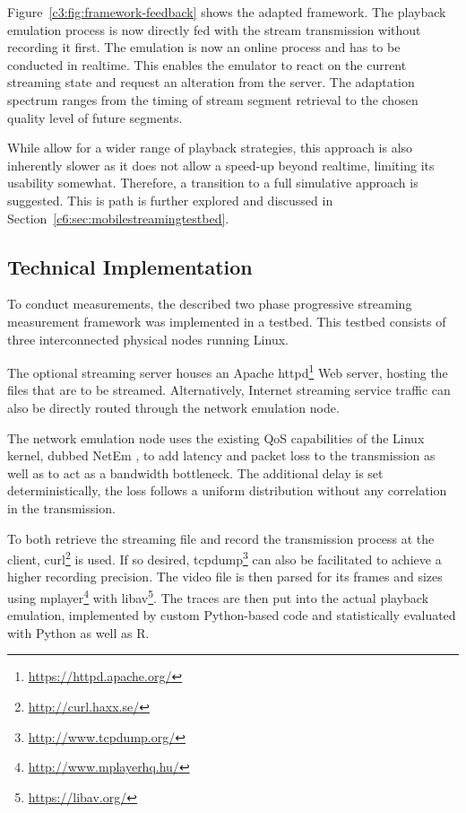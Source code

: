 Figure~\ref{c3:fig:framework-feedback} shows the adapted framework. The playback emulation process is now directly fed with the stream transmission without recording it first. The emulation is now an online process and has to be conducted in realtime. This enables the emulator to react on the current streaming state and request an alteration from the server. The adaptation spectrum ranges from the timing of stream segment retrieval to the chosen quality level of future segments. 

While allow for a wider range of playback strategies, this approach is also inherently slower as it does not allow a speed-up beyond realtime, limiting its usability somewhat. Therefore, a transition to a full simulative approach is suggested. This is path is further explored and discussed in Section~\ref{c6:sec:mobilestreamingtestbed}.



\subsection{Technical Implementation}

To conduct measurements, the described two phase progressive streaming measurement framework was implemented in a testbed. This testbed consists of three interconnected physical nodes running Linux. 

The optional streaming server houses an Apache httpd\footnote{\url{https://httpd.apache.org/}} Web server, hosting the files that are to be streamed. Alternatively, Internet streaming service traffic can also be directly routed through the network emulation node.

The network emulation node uses the existing \gls{QoS} capabilities of the Linux kernel, dubbed NetEm \cite{hemminger2005network}, to add latency and packet loss to the transmission as well as to act as a bandwidth bottleneck. The additional delay is set deterministically, the loss follows a uniform distribution without any correlation in the transmission.

To both retrieve the streaming file and record the transmission process at the client, curl\footnote{\url{http://curl.haxx.se/}} is used. If so desired, tcpdump\footnote{\url{http://www.tcpdump.org/}} can also be facilitated to achieve a higher recording precision. The video file is then parsed for its frames and sizes using mplayer\footnote{\url{http://www.mplayerhq.hu/}} with libav\footnote{\url{https://libav.org/}}. The traces are then put into the actual playback emulation, implemented by custom Python-based code and statistically evaluated with Python as well as R.



